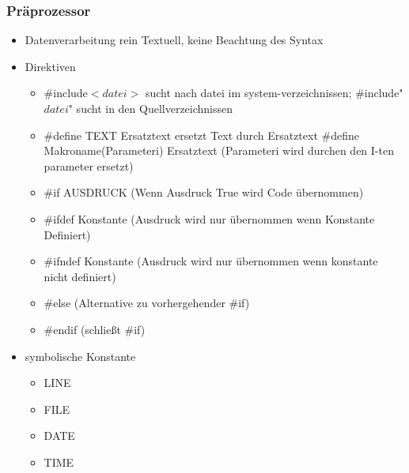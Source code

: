 \documentclass[10pt,a5paper]{article}
\begin{document}
\subsubsection{Präprozessor}
\begin{itemize}
\item Datenverarbeitung rein Textuell, keine Beachtung des Syntax
\item Direktiven \begin{itemize}
\item \#include\ensuremath{<datei>} sucht nach datei im system-verzeichnissen; \#include"\ensuremath{datei}" sucht in den Quellverzeichnissen
\item \#define TEXT Ersatztext ersetzt Text durch Ersatztext
\subitem \#define Makroname(Parameter\textunderscore i) Ersatztext (Parameter\textunderscore i wird durchen den I-ten parameter ersetzt)
\item \#if AUSDRUCK (Wenn Ausdruck True wird Code übernommen)
\item \#ifdef Konstante (Ausdruck wird nur übernommen wenn Konstante Definiert)
\item \#ifndef Konstante (Ausdruck wird nur übernommen wenn konstante nicht definiert)
\item \#else (Alternative zu vorhergehender \#if)
\item \#endif (schließt \#if)
\end{itemize}
\item symbolische Konstante\begin{itemize}
\item \textunderscore\textunderscore LINE\textunderscore\textunderscore
\item \textunderscore\textunderscore FILE\textunderscore\textunderscore
\item \textunderscore\textunderscore DATE\textunderscore\textunderscore
\item \textunderscore\textunderscore TIME\textunderscore\textunderscore
\end{itemize}
\end{itemize}
\end{document}
